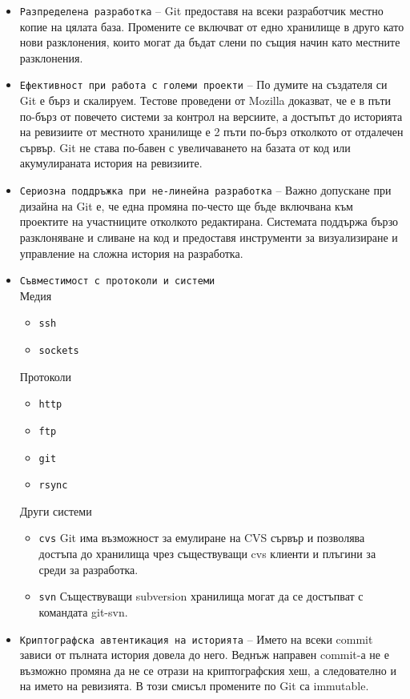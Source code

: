 \documentclass[a4paper]{article}
\begin{document}
    \begin{itemize}
      \item \texttt{Разпределена разработка} -- Git предоставя на всеки разработчик местно копие на цялата база. Промените се включват от едно хранилище в друго като нови разклонения, които могат да бъдат слени по същия начин като местните разклонения.
      \item \texttt{Ефективност при работа с големи проекти} -- По думите на създателя си Git е бърз и скалируем. Тестове проведени от Mozilla доказват, че е в пъти по-бърз от повечето системи за контрол на версиите, а достъпът до историята на ревизиите от местното хранилище е 2 пъти по-бърз отколкото от отдалечен сървър. Git не става по-бавен с увеличаването на базата от код или акумулираната история на ревизиите.
      \item \texttt{Сериозна поддръжка при не-линейна разработка} -- Важно допускане при дизайна на Git е, че една промяна по-често ще бъде включвана към проектите на участниците отколкото редактирана. Системата поддържа бързо разклоняване и сливане на код и предоставя инструменти за визуализиране и управление на сложна история на разработка.
      \item \texttt{Съвместимост с протоколи и системи} \\
        Медия
        \begin{itemize}
          \item \texttt{ssh}
          \item \texttt{sockets}
        \end{itemize}
        Протоколи
        \begin{itemize}
          \item \texttt{http}
          \item \texttt{ftp}
          \item \texttt{git}
          \item \texttt{rsync}
        \end{itemize}
        Други системи
        \begin{itemize}
          \item \texttt{cvs} Git има възможност за емулиране на CVS сървър и позволява достъпа до хранилища чрез съществуващи cvs клиенти и плъгини за среди за разработка.
          \item \texttt{svn} Съществуващи subversion хранилища могат да се достъпват с командата git-svn.
        \end{itemize}
      \item \texttt{Криптографска автентикация на историята} -- Името на всеки commit зависи от пълната история довела до него. Веднъж направен commit-а не е възможно промяна да не се отрази на криптографския хеш, а следователно и на името на ревизията. В този смисъл промените по Git са immutable.

\end{itemize}
\end{document}

